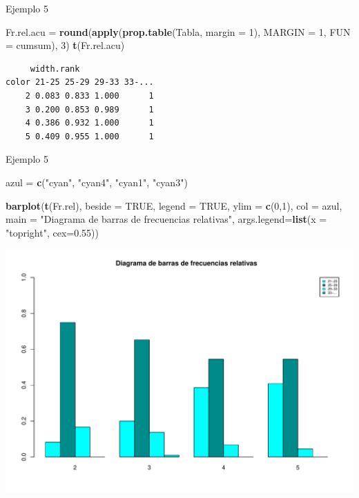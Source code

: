 \documentclass[
  ignorenonframetext,
]{beamer}
\newenvironment{Shaded}{\begin{snugshade}}{\end{snugshade}}
\newcommand{\AttributeTok}[1]{\textcolor[rgb]{0.13,0.29,0.53}{#1}}
\newcommand{\ConstantTok}[1]{\textcolor[rgb]{0.56,0.35,0.01}{#1}}
\newcommand{\DecValTok}[1]{\textcolor[rgb]{0.00,0.00,0.81}{#1}}
\newcommand{\FloatTok}[1]{\textcolor[rgb]{0.00,0.00,0.81}{#1}}
\newcommand{\FunctionTok}[1]{\textcolor[rgb]{0.13,0.29,0.53}{\textbf{#1}}}
\newcommand{\NormalTok}[1]{#1}
\newcommand{\OtherTok}[1]{\textcolor[rgb]{0.56,0.35,0.01}{#1}}
\newcommand{\StringTok}[1]{\textcolor[rgb]{0.31,0.60,0.02}{#1}}
\begin{document}
\begin{frame}[fragile]{Ejemplo 5}
\label{ejemplo-5-15}
\begin{Shaded}
\begin{Highlighting}[]
\NormalTok{Fr.rel.acu }\OtherTok{=} \FunctionTok{round}\NormalTok{(}\FunctionTok{apply}\NormalTok{(}\FunctionTok{prop.table}\NormalTok{(Tabla, }\AttributeTok{margin =} \DecValTok{1}\NormalTok{), }\AttributeTok{MARGIN =} \DecValTok{1}\NormalTok{, }\AttributeTok{FUN =}\NormalTok{ cumsum), }\DecValTok{3}\NormalTok{)}
\FunctionTok{t}\NormalTok{(Fr.rel.acu)}
\end{Highlighting}
\end{Shaded}

\begin{verbatim}
     width.rank
color 21-25 25-29 29-33 33-...
    2 0.083 0.833 1.000      1
    3 0.200 0.853 0.989      1
    4 0.386 0.932 1.000      1
    5 0.409 0.955 1.000      1
\end{verbatim}
\end{frame}

\begin{frame}[fragile]{Ejemplo 5}
\label{ejemplo-5-16}
\begin{Shaded}
\begin{Highlighting}[]
\NormalTok{azul }\OtherTok{=} \FunctionTok{c}\NormalTok{(}\StringTok{"cyan"}\NormalTok{, }\StringTok{"cyan4"}\NormalTok{, }\StringTok{"cyan1"}\NormalTok{, }\StringTok{"cyan3"}\NormalTok{)}

\FunctionTok{barplot}\NormalTok{(}\FunctionTok{t}\NormalTok{(Fr.rel), }\AttributeTok{beside =} \ConstantTok{TRUE}\NormalTok{, }\AttributeTok{legend =} \ConstantTok{TRUE}\NormalTok{, }\AttributeTok{ylim =} \FunctionTok{c}\NormalTok{(}\DecValTok{0}\NormalTok{,}\DecValTok{1}\NormalTok{), }\AttributeTok{col =}\NormalTok{ azul, }
        \AttributeTok{main =} \StringTok{"Diagrama de barras de frecuencias relativas"}\NormalTok{, }
        \AttributeTok{args.legend=}\FunctionTok{list}\NormalTok{(}\AttributeTok{x =} \StringTok{"topright"}\NormalTok{, }\AttributeTok{cex=}\FloatTok{0.55}\NormalTok{))}
\end{Highlighting}
\end{Shaded}

\includegraphics[width=0.8\linewidth]{R_base_files/figure-beamer/unnamed-chunk-160-1}
\end{frame}
\end{document}
